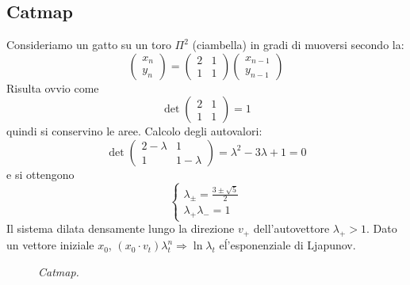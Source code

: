 \documentclass[12pt, a4paper]{book}
\theoremstyle{theorem}
\begin{document}
			\subsection{Catmap}
				Consideriamo un gatto su un toro $\Pi^{2}$ (ciambella) in gradi di muoversi secondo la:
				\begin{equation*}
					\left(
					\begin{matrix}
						x_{n} \\
						y_{n} 
					\end{matrix}
					\right)=
					\left(
					\begin{matrix}
						2 & 1\\
						1 & 1 
					\end{matrix}
					\right)
					\left(
					\begin{matrix}
						x_{n-1} \\
						y_{n-1} 
					\end{matrix}
					\right)
				\end{equation*}
				Risulta ovvio come
				\begin{equation*}
					\det
					\left(
						\begin{matrix}
							2 & 1\\
							1 & 1 
						\end{matrix}
					\right)=1
				\end{equation*}
				quindi si conservino le aree.
				Calcolo degli autovalori:
				\begin{equation*}
					\det
					\left(
						\begin{matrix}
							2-\lambda & 1\\
							1 & 1-\lambda
						\end{matrix}
					\right)=\lambda^{2}-3\lambda+1=0
				\end{equation*}
				e si ottengono
				\begin{equation*}
					\begin{cases}
						\lambda_{\pm}=\frac{3\pm\sqrt{5}}{2}\\
						\lambda_{+}\lambda_{-}=1
					\end{cases}
				\end{equation*}
				Il sistema dilata densamente lungo la direzione $v_{+}$ dell'autovettore $\lambda_{+}>1$.
				Dato un vettore iniziale $x_{0}$, $(x_{0}\cdot v_{t})\lambda_{t}^{n} \Rightarrow \ln\lambda_{t}$ e\' l'esponenziale di Ljapunov.
				\begin{figure}[H]
					\centering
					\caption{\emph{Catmap.}}
					\label{figure:catmap}
				\end{figure}
\end{document}
